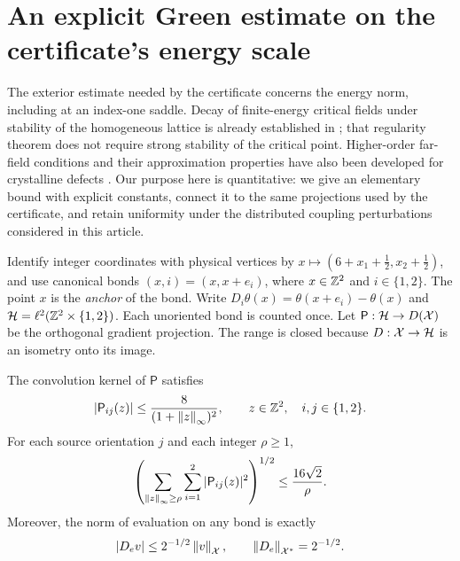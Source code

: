 \section{An explicit Green estimate on the certificate's energy scale}
\label{sec:green}

The exterior estimate needed by the certificate concerns the energy norm,
including at an index-one saddle.  Decay of finite-energy critical fields
under stability of the homogeneous lattice is already established in
\cite[Theorem~2.3]{Ehrlacher2016}; that regularity theorem does not require
strong stability of the critical point.  Higher-order far-field conditions
and their approximation properties have also been developed for crystalline
defects \cite{Braun2025,Wei2026}.  Our purpose here is quantitative: we give
an elementary bound with explicit constants, connect it to the same
projections used by the certificate, and retain uniformity under the
distributed coupling perturbations considered in this article.

Identify integer coordinates with physical vertices by
$x\mapsto(6+x_1+\tfrac12,x_2+\tfrac12)$, and use canonical bonds
$(x,i)=(x,x+e_i)$, where $x\in\mathbb Z^2$ and $i\in\{1,2\}$.
The point $x$ is the \emph{anchor} of the bond.  Write
$D_i\theta(x)=\theta(x+e_i)-\theta(x)$ and
$\mathcal H=\ell^2(\mathbb Z^2\times\{1,2\})$.  Each unoriented bond is counted
once.  Let $\mathsf P:\mathcal H\to D(\mathcal X)$ be the orthogonal gradient
projection.  The range is closed because $D:\mathcal X\to\mathcal H$ is an
isometry onto its image.

\begin{lemma}
\label{lem:green-kernel}
The convolution kernel of $\mathsf P$ satisfies
\begin{equation}
 |\mathsf P_{ij}(z)|\le\frac{8}{(1+\left\lVert z\right\rVert_\infty)^2},
 \qquad z\in\mathbb Z^2,\quad i,j\in\{1,2\}.
 \label{eq:green-kernel}
\end{equation}
For each source orientation $j$ and each integer $\rho\ge1$,
\begin{equation}
 \left(\sum_{\left\lVert z\right\rVert_\infty\ge\rho}\sum_{i=1}^2
       |\mathsf P_{ij}(z)|^2\right)^{1/2}
 \le\frac{16\sqrt2}{\rho}.
 \label{eq:green-column}
\end{equation}
Moreover, the norm of evaluation on any bond is exactly
\begin{equation}
 |D_e v|\le 2^{-1/2}\left\lVert v\right\rVert_\mathcal X,
 \qquad \left\lVert D_e\right\rVert_{\mathcal X^*}=2^{-1/2}.
 \label{eq:edge-evaluation}
\end{equation}
\end{lemma}

